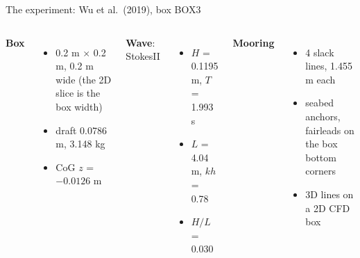 \documentclass[aspectratio=169,10pt]{beamer}
\begin{document}
\begin{frame}{The experiment: Wu et al.\ (2019), box BOX3}
  \vspace{1mm}
  \begin{columns}[T]
    \small
    \textbf{Box}
    \begin{itemize}
      \item 0.2 m $\times$ 0.2 m, 0.2 m wide (the 2D slice is the box width)
      \item draft 0.0786 m, 3.148 kg
      \item CoG $z$ = $-0.0126$ m
    \end{itemize}
    \small
    \textbf{Wave}: StokesII
    \begin{itemize}
      \item $H$ = 0.1195 m, $T$ = 1.993 s
      \item $L$ = 4.04 m, $kh$ = 0.78
      \item $H/L$ = 0.030
    \end{itemize}
    \small
    \textbf{Mooring}
    \begin{itemize}
      \item 4 slack lines, 1.455 m each
      \item seabed anchors, fairleads on the box bottom corners
      \item 3D lines on a 2D CFD box
    \end{itemize}
  \end{columns}
\end{frame}
\end{document}

